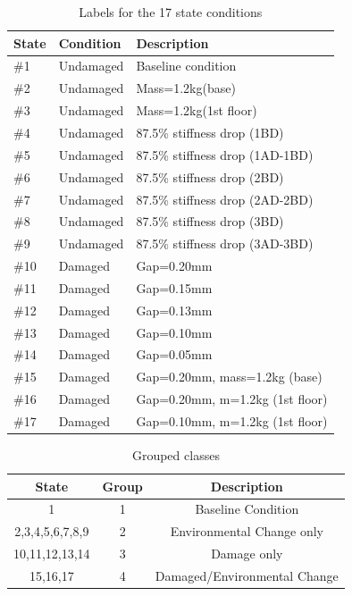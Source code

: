 \documentclass[twocolumn]{article}
\begin{document}
\begin{table}[H]
      \small
      \centering
      \caption{Labels for the 17 state conditions}
      \begin{tabular}{ m{1.4em} m{1.6cm} m{5cm}}
            State &  Condition & Description \\
            \hline
            \#1 & Undamaged & Baseline condition \\
            \#2 & Undamaged & Mass=1.2kg(base) \\
            \#3 & Undamaged & Mass=1.2kg(1st floor) \\
            \#4 & Undamaged & 87.5\% stiffness drop (1BD) \\
            \#5 & Undamaged & 87.5\% stiffness drop (1AD-1BD) \\
            \#6 & Undamaged & 87.5\% stiffness drop (2BD) \\
            \#7 & Undamaged & 87.5\% stiffness drop (2AD-2BD)\\
            \#8 & Undamaged & 87.5\% stiffness drop (3BD) \\
            \#9 & Undamaged & 87.5\% stiffness drop (3AD-3BD) \\
            \#10 & Damaged & Gap=0.20mm \\
            \#11 & Damaged & Gap=0.15mm \\
            \#12 & Damaged & Gap=0.13mm \\
            \#13 & Damaged & Gap=0.10mm \\
            \#14 & Damaged & Gap=0.05mm \\
            \#15 & Damaged & Gap=0.20mm, mass=1.2kg (base) \\
            \#16 & Damaged & Gap=0.20mm, m=1.2kg (1st floor) \\
            \#17 & Damaged & Gap=0.10mm, m=1.2kg (1st floor)
      \end{tabular}
      \label{table:statesTable}
\end{table}

\begin{table}[H]
      \small
      \centering
      \caption{Grouped classes}
      \begin{tabular}{ccc}
            State &  Group & Description \\
            \hline
            1 & 1 & Baseline Condition \\
            2,3,4,5,6,7,8,9 & 2 & Environmental Change only \\
            10,11,12,13,14  & 3 & Damage only \\
            15,16,17 & 4 & Damaged/Environmental Change
      \end{tabular}
      \label{table:GroupTable}
\end{table}
\end{document}
